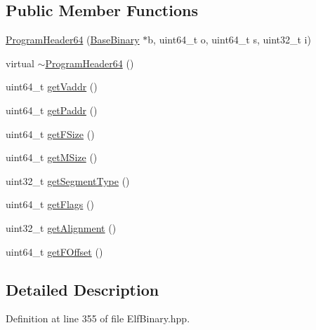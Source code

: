 \subsection*{\-Public \-Member \-Functions}
\begin{DoxyCompactItemize}
\item 
\hyperlink{class_e_p_a_x_1_1_elf_1_1_program_header64_aa65ae437cdc94378ed92b3a843325d3e}{\-Program\-Header64} (\hyperlink{class_e_p_a_x_1_1_base_binary}{\-Base\-Binary} $\ast$b, uint64\-\_\-t o, uint64\-\_\-t s, uint32\-\_\-t i)
\item 
virtual \hyperlink{class_e_p_a_x_1_1_elf_1_1_program_header64_a0f4239d70bbccd023c1861f0c3e55b2b}{$\sim$\-Program\-Header64} ()
\item 
uint64\-\_\-t \hyperlink{class_e_p_a_x_1_1_elf_1_1_program_header64_a3b8ed64a54eb47450dff7be0ee28817b}{get\-Vaddr} ()
\item 
uint64\-\_\-t \hyperlink{class_e_p_a_x_1_1_elf_1_1_program_header64_a7e1bc27b844418b80f56c458a49797a6}{get\-Paddr} ()
\item 
uint64\-\_\-t \hyperlink{class_e_p_a_x_1_1_elf_1_1_program_header64_a04e7b5890ccc7c01d23e221fbfc44708}{get\-F\-Size} ()
\item 
uint64\-\_\-t \hyperlink{class_e_p_a_x_1_1_elf_1_1_program_header64_a821b37a8d6ebdf7fea555e7a4434eac2}{get\-M\-Size} ()
\item 
uint32\-\_\-t \hyperlink{class_e_p_a_x_1_1_elf_1_1_program_header64_a5a35087dbe63d5fdabd5893bb57c38a3}{get\-Segment\-Type} ()
\item 
uint64\-\_\-t \hyperlink{class_e_p_a_x_1_1_elf_1_1_program_header64_a9f12ad0de269ad3c5c7f2fc52f72fc5a}{get\-Flags} ()
\item 
uint32\-\_\-t \hyperlink{class_e_p_a_x_1_1_elf_1_1_program_header64_a68a761d44891ce538049b04236fe2a9c}{get\-Alignment} ()
\item 
uint64\-\_\-t \hyperlink{class_e_p_a_x_1_1_elf_1_1_program_header64_adde9f4fb75d093fcc7f30d42909f8ef5}{get\-F\-Offset} ()
\end{DoxyCompactItemize}


\subsection{\-Detailed \-Description}


\-Definition at line 355 of file \-Elf\-Binary.\-hpp.




